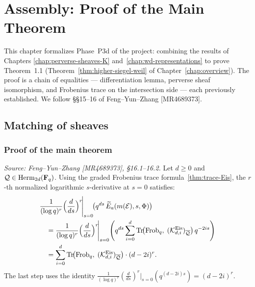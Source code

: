 \chapter{Assembly: Proof of the Main Theorem}
\label{chap:assembly}

This chapter formalizes Phase~P3d of the project: combining the results of Chapters
\ref{chap:perverse-sheaves-K} and~\ref{chap:wd-representations} to prove Theorem~1.1
(Theorem~\ref{thm:higher-siegel-weil} of Chapter~\ref{chap:overview}). The proof is a
chain of equalities — differentiation lemma, perverse sheaf isomorphism, and Frobenius
trace on the intersection side — each previously established. We follow \S\S15--16 of
Feng--Yun--Zhang [MR4689373].

\section{Matching of sheaves}

\subsection{Proof of the main theorem}

\begin{lemma}
  \label{lem:differentiate-q}
  \textit{Source: Feng--Yun--Zhang [MR4689373], \S16.1--16.2.}
  Let \(d \geq 0\) and \(\mathcal{Q} \in \operatorname{Herm}_{2d}(\mathbf{F}_q)\). Using the graded
  Frobenius trace formula~\ref{thm:trace-Eis}, the \(r\)-th normalized logarithmic
  \(s\)-derivative at \(s = 0\) satisfies:
  \begin{align*}
    &\frac{1}{(\log q)^r}
    \Bigl(\frac{d}{ds}\Bigr)^r\!\Bigg|_{s=0}
    \!\bigl(q^{ds}\,\widetilde{E}_a(m(\mathcal{E}), s, \Phi)\bigr)
    \\
    &\quad=
    \frac{1}{(\log q)^r}
    \Bigl(\frac{d}{ds}\Bigr)^r\!\Bigg|_{s=0}
    \Biggl(
      q^{ds} \sum_{i=0}^d
      \operatorname{Tr}\!\bigl(\operatorname{Frob}_q,\; (\mathcal{K}^{\mathrm{Eis}}_{d,i})_{\overline{\mathcal{Q}}}\bigr)\,
      q^{-2is}
    \Biggr)
    \\
    &\quad=
    \sum_{i=0}^d
    \operatorname{Tr}\!\bigl(\operatorname{Frob}_q,\; (\mathcal{K}^{\mathrm{Eis}}_{d,i})_{\overline{\mathcal{Q}}}\bigr)\cdot
    (d - 2i)^r.
  \end{align*}
  The last step uses the identity
  \(\frac{1}{(\log q)^r}(\frac{d}{ds})^r|_{s=0}(q^{(d-2i)s}) = (d-2i)^r\).
\end{lemma}


